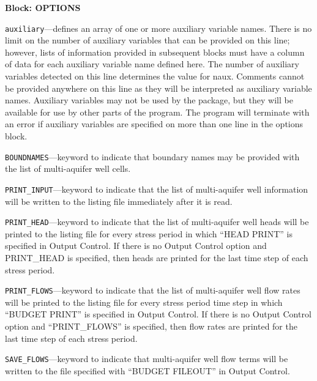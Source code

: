 
\item \textbf{Block: OPTIONS}

\begin{description}
\item \texttt{auxiliary}---defines an array of one or more auxiliary variable names.  There is no limit on the number of auxiliary variables that can be provided on this line; however, lists of information provided in subsequent blocks must have a column of data for each auxiliary variable name defined here.   The number of auxiliary variables detected on this line determines the value for naux.  Comments cannot be provided anywhere on this line as they will be interpreted as auxiliary variable names.  Auxiliary variables may not be used by the package, but they will be available for use by other parts of the program.  The program will terminate with an error if auxiliary variables are specified on more than one line in the options block.

\item \texttt{BOUNDNAMES}---keyword to indicate that boundary names may be provided with the list of multi-aquifer well cells.

\item \texttt{PRINT\_INPUT}---keyword to indicate that the list of multi-aquifer well information will be written to the listing file immediately after it is read.

\item \texttt{PRINT\_HEAD}---keyword to indicate that the list of multi-aquifer well heads will be printed to the listing file for every stress period in which ``HEAD PRINT'' is specified in Output Control.  If there is no Output Control option and PRINT\_HEAD is specified, then heads are printed for the last time step of each stress period.

\item \texttt{PRINT\_FLOWS}---keyword to indicate that the list of multi-aquifer well flow rates will be printed to the listing file for every stress period time step in which ``BUDGET PRINT'' is specified in Output Control.  If there is no Output Control option and ``PRINT\_FLOWS'' is specified, then flow rates are printed for the last time step of each stress period.

\item \texttt{SAVE\_FLOWS}---keyword to indicate that multi-aquifer well flow terms will be written to the file specified with ``BUDGET FILEOUT'' in Output Control.


\end{description}
